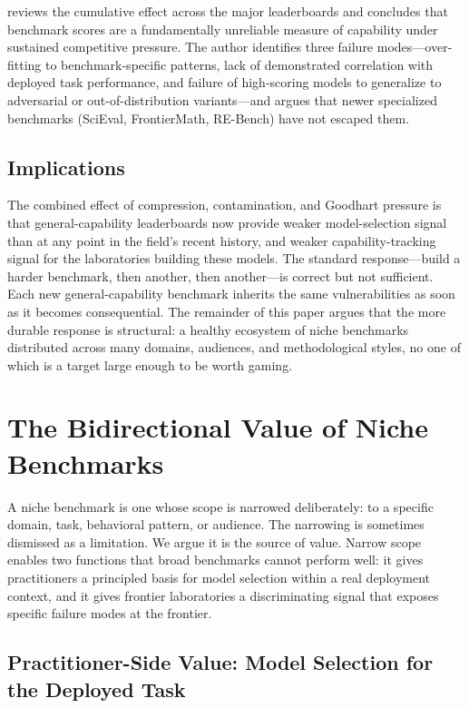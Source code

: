 \documentclass[11pt,a4paper]{article}
\begin{document}
\citet{linegoesup2025} reviews the cumulative effect across the major leaderboards and concludes that benchmark scores are a fundamentally unreliable measure of capability under sustained competitive pressure. The author identifies three failure modes---over-fitting to benchmark-specific patterns, lack of demonstrated correlation with deployed task performance, and failure of high-scoring models to generalize to adversarial or out-of-distribution variants---and argues that newer specialized benchmarks (SciEval, FrontierMath, RE-Bench) have not escaped them.

\subsection{Implications}
\label{sec:saturationimplications}

The combined effect of compression, contamination, and Goodhart pressure is that general-capability leaderboards now provide weaker model-selection signal than at any point in the field's recent history, and weaker capability-tracking signal for the laboratories building these models. The standard response---build a harder benchmark, then another, then another---is correct but not sufficient. Each new general-capability benchmark inherits the same vulnerabilities as soon as it becomes consequential. The remainder of this paper argues that the more durable response is structural: a healthy ecosystem of niche benchmarks distributed across many domains, audiences, and methodological styles, no one of which is a target large enough to be worth gaming.

\section{The Bidirectional Value of Niche Benchmarks}
\label{sec:bidirectional}

A niche benchmark is one whose scope is narrowed deliberately: to a specific domain, task, behavioral pattern, or audience. The narrowing is sometimes dismissed as a limitation. We argue it is the source of value. Narrow scope enables two functions that broad benchmarks cannot perform well: it gives practitioners a principled basis for model selection within a real deployment context, and it gives frontier laboratories a discriminating signal that exposes specific failure modes at the frontier.

\subsection{Practitioner-Side Value: Model Selection for the Deployed Task}
\label{sec:practitioner}
\end{document}
